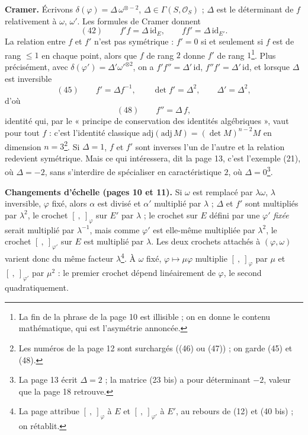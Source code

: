 \documentclass[11pt,a4paper]{article}
\begin{document}
\textbf{Cramer.} Écrivons $\delta(\varphi) = \Delta\, \omega^{\otimes -2}$, $\Delta \in
\Gamma(S, \mathcal{O}_S)$ ; $\Delta$ est le déterminant de $f$ relativement à
$\omega$, $\omega'$. Les formules de Cramer donnent
\[
  (42) \qquad f'f = \Delta\, \mathrm{id}_E , \qquad ff' = \Delta\, \mathrm{id}_{E'} .
\]
La relation entre $f$ et $f'$ n'est pas symétrique : $f' = 0$ si et seulement si
$f$ est de rang $\leq 1$ en chaque point, alors que $f$ de rang $2$ donne $f'$ de
rang $1$\footnote{La fin de la phrase de la page 10 est illisible ; on en donne
le contenu mathématique, qui est l'asymétrie annoncée.}. Plus précisément, avec
$\delta(\varphi') = \Delta' \omega'^{\otimes 2}$, on a $f'f'' = \Delta'\,\mathrm{id}$,
$f''f' = \Delta'\,\mathrm{id}$, et lorsque $\Delta$ est inversible
\[
  (45) \qquad f' = \Delta f^{-1} , \qquad \det f' = \Delta^2 , \qquad \Delta' = \Delta^2 ,
\]
d'où
\[
  (48) \qquad f'' = \Delta\, f ,
\]
identité qui, par le « principe de conservation des identités algébriques »,
vaut pour tout $f$ : c'est l'identité classique $\mathrm{adj}(\mathrm{adj}\, M) =
(\det M)^{n-2} M$ en dimension $n = 3$\footnote{Les numéros de la page 12 sont
surchargés ((46) ou (47)) ; on garde (45) et (48).}. Si $\Delta = 1$, $f$ et $f'$
sont inverses l'un de l'autre et la relation redevient symétrique. Mais ce qui
intéressera, dit la page 13, c'est l'exemple (21), où $\Delta = -2$, sans
s'interdire de spécialiser en caractéristique $2$, où $\Delta = 0$\footnote{La
page 13 écrit $\Delta = 2$ ; la matrice (23 bis) a pour déterminant $-2$, valeur
que la page 18 retrouve.}.

\textbf{Changements d'échelle (pages 10 et 11).} Si $\omega$ est remplacé par
$\lambda\omega$, $\lambda$ inversible, $\varphi$ fixé, alors $\alpha$ est divisé et
$\alpha'$ multiplié par $\lambda$ ; $\Delta$ et $f'$ sont multipliés par $\lambda^2$,
le crochet $[\ ,\ ]_{\varphi}$ sur $E'$ par $\lambda$ ; le crochet sur $E$ défini par
une $\varphi'$ \emph{fixée} serait multiplié par $\lambda^{-1}$, mais comme $\varphi'$
est elle-même multipliée par $\lambda^2$, le crochet $[\ ,\ ]_{\varphi'}$ sur $E$ est
multiplié par $\lambda$. Les deux crochets attachés à $(\varphi, \omega)$ varient donc
du même facteur $\lambda$\footnote{La page attribue $[\ ,\ ]_{\varphi}$ à $E$ et
$[\ ,\ ]_{\varphi'}$ à $E'$, au rebours de (12) et (40 bis) ; on rétablit.}. À
$\omega$ fixé, $\varphi \mapsto \mu\varphi$ multiplie $[\ ,\ ]_{\varphi}$ par $\mu$ et
$[\ ,\ ]_{\varphi'}$ par $\mu^2$ : le premier crochet dépend linéairement de $\varphi$,
le second quadratiquement.
\end{document}
